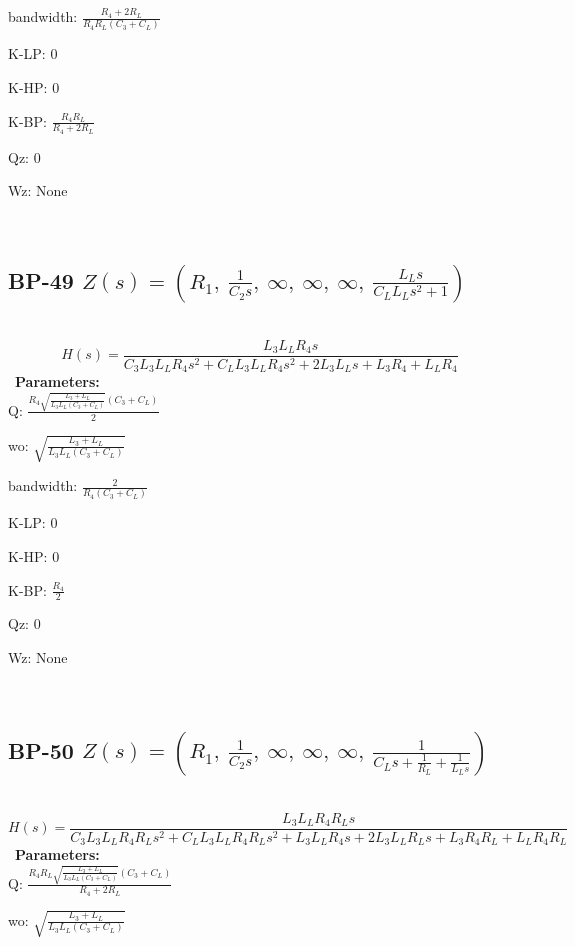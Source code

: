 \documentclass{article}
\begin{document}
bandwidth: $\frac{R_{4} + 2 R_{L}}{R_{4} R_{L} \left(C_{3} + C_{L}\right)}$\ 

K-LP: $0$\ 

K-HP: $0$\ 

K-BP: $\frac{R_{4} R_{L}}{R_{4} + 2 R_{L}}$\ 

Qz: $0$\ 

Wz: $\text{None}$\ 

\ 

\subsection{BP-49 $Z(s) = \left( R_{1}, \  \frac{1}{C_{2} s}, \  \infty, \  \infty, \  \infty, \  \frac{L_{L} s}{C_{L} L_{L} s^{2} + 1}\right)$ } \ 
\textbf{\[H(s) = \frac{L_{3} L_{L} R_{4} s}{C_{3} L_{3} L_{L} R_{4} s^{2} + C_{L} L_{3} L_{L} R_{4} s^{2} + 2 L_{3} L_{L} s + L_{3} R_{4} + L_{L} R_{4}}\] } \ 
\textbf{Parameters:}\\ 

Q: $\frac{R_{4} \sqrt{\frac{L_{3} + L_{L}}{L_{3} L_{L} \left(C_{3} + C_{L}\right)}} \left(C_{3} + C_{L}\right)}{2}$\ 

wo: $\sqrt{\frac{L_{3} + L_{L}}{L_{3} L_{L} \left(C_{3} + C_{L}\right)}}$\ 

bandwidth: $\frac{2}{R_{4} \left(C_{3} + C_{L}\right)}$\ 

K-LP: $0$\ 

K-HP: $0$\ 

K-BP: $\frac{R_{4}}{2}$\ 

Qz: $0$\ 

Wz: $\text{None}$\ 

\ 

\subsection{BP-50 $Z(s) = \left( R_{1}, \  \frac{1}{C_{2} s}, \  \infty, \  \infty, \  \infty, \  \frac{1}{C_{L} s + \frac{1}{R_{L}} + \frac{1}{L_{L} s}}\right)$ } \ 
\textbf{\[H(s) = \frac{L_{3} L_{L} R_{4} R_{L} s}{C_{3} L_{3} L_{L} R_{4} R_{L} s^{2} + C_{L} L_{3} L_{L} R_{4} R_{L} s^{2} + L_{3} L_{L} R_{4} s + 2 L_{3} L_{L} R_{L} s + L_{3} R_{4} R_{L} + L_{L} R_{4} R_{L}}\] } \ 
\textbf{Parameters:}\\ 

Q: $\frac{R_{4} R_{L} \sqrt{\frac{L_{3} + L_{L}}{L_{3} L_{L} \left(C_{3} + C_{L}\right)}} \left(C_{3} + C_{L}\right)}{R_{4} + 2 R_{L}}$\ 

wo: $\sqrt{\frac{L_{3} + L_{L}}{L_{3} L_{L} \left(C_{3} + C_{L}\right)}}$\ 
\end{document}
